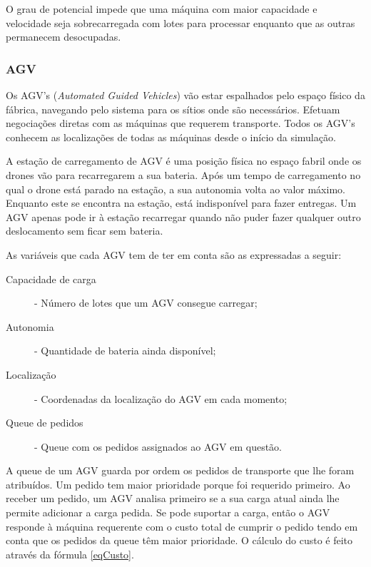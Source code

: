 \begin{titlepage}
  O grau de potencial impede que uma máquina com maior capacidade e velocidade seja sobrecarregada com lotes para processar enquanto que as outras permanecem desocupadas.

\subsubsection{AGV}

Os AGV's (\textit{Automated Guided Vehicles}) vão estar espalhados pelo espaço físico da fábrica, navegando pelo sistema para os sítios onde são necessários. Efetuam negociações diretas com as máquinas que requerem transporte. Todos os AGV's conhecem as localizações de todas as máquinas desde o início da simulação.\newline

A estação de carregamento de AGV é uma posição física no espaço fabril onde os drones vão para recarregarem a sua bateria. Após um tempo de carregamento no qual o drone está parado na estação, a sua autonomia volta ao valor máximo. Enquanto este se encontra na estação, está indisponível para fazer entregas. Um AGV apenas pode ir à estação recarregar quando não puder fazer qualquer outro deslocamento sem ficar sem bateria.\newline

As variáveis que cada AGV tem de ter em conta são as expressadas a seguir:

\begin{description}
\item[Capacidade de carga] - Número de lotes que um AGV consegue carregar;
\item[Autonomia] - Quantidade de bateria ainda disponível;
\item[Localização] - Coordenadas da localização do AGV em cada momento;
\item[Queue de pedidos] - Queue com os pedidos assignados ao AGV em questão.
\end{description}

A queue de um AGV guarda por ordem os pedidos de transporte que lhe foram atribuídos. Um pedido tem maior prioridade porque foi requerido primeiro. Ao receber um pedido, um AGV analisa primeiro se a sua carga atual ainda lhe permite adicionar a carga pedida. Se pode suportar a carga, então o AGV responde à máquina requerente com o custo total de cumprir o pedido tendo em conta que os pedidos da queue têm maior prioridade. O cálculo do custo é feito através da fórmula \ref{eqCusto}.


\end{titlepage}
